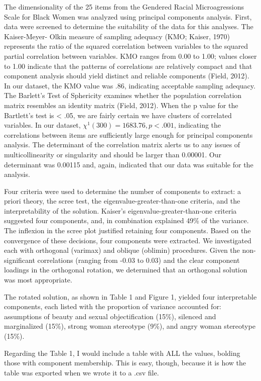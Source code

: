 \documentclass[
  english,
]{book}
\begin{document}
The dimensionality of the 25 items from the Gendered Racial Microagressions Scale for Black Women was analyzed using principal components analysis. First, data were screened to determine the suitability of the data for this analyses. The Kaiser-Meyer- Olkin measure of sampling adequacy (KMO; Kaiser, 1970) represents the ratio of the squared correlation between variables to the squared partial correlation between variables. KMO ranges from 0.00 to 1.00; values closer to 1.00 indicate that the patterns of correlations are relatively compact and that component analysis should yield distinct and reliable components (Field, 2012). In our dataset, the KMO value was .86, indicating acceptable sampling adequacy. The Barlett's Test of Sphericity examines whether the population correlation matrix resembles an identity matrix (Field, 2012). When the p value for the Bartlett's test is \textless{} .05, we are fairly certain we have clusters of correlated variables. In our dataset, \(\chi ^{1}(300)=1683.76, p < .001\), indicating the correlations between items are sufficiently large enough for principal components analysis. The determinant of the correlation matrix alerts us to any issues of multicollinearity or singularity and should be larger than 0.00001. Our determinant was 0.00115 and, again, indicated that our data was suitable for the analysis.

Four criteria were used to determine the number of components to extract: a priori theory, the scree test, the eigenvalue-greater-than-one criteria, and the interpretability of the solution. Kaiser's eigenvalue-greater-than-one criteria suggested four components, and, in combination explained 49\% of the variance. The inflexion in the scree plot justified retaining four components. Based on the convergence of these decisions, four components were extracted. We investigated each with orthogonal (varimax) and oblique (oblimin) procedures. Given the non-significant correlations (ranging from -0.03 to 0.03) and the clear component loadings in the orthogonal rotation, we determined that an orthogonal solution was most appropriate.

The rotated solution, as shown in Table 1 and Figure 1, yielded four interpretable components, each listed with the proportion of variance accounted for: assumptions of beauty and sexual objectification (15\%), silenced and marginalized (15\%), strong woman stereotype (9\%), and angry woman stereotype (15\%).

Regarding the Table 1, I would include a table with ALL the values, bolding those with component membership. This is easy, though, because it is how the table was exported when we wrote it to a .csv file.
\end{document}
